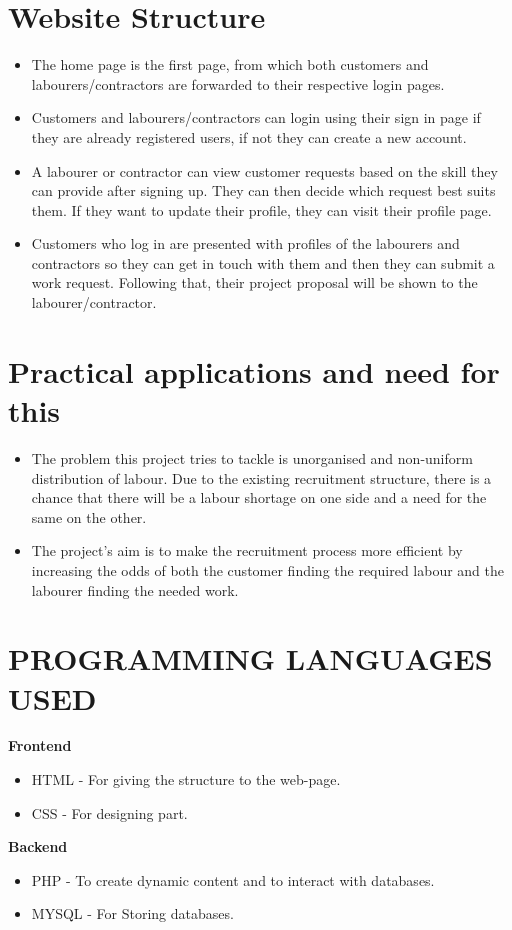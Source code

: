 \documentclass[12pt]{article}
\begin{document}
\section*{Website Structure}
\begin{itemize}
\item The home page is the first page, from which both customers and labourers/contractors are forwarded to their respective login pages.
\item Customers and labourers/contractors can login using their sign in page if they are already registered users, if not they can create a new account.
\item A labourer or contractor can view customer requests based on the skill they can provide after signing up. They can then decide which request best suits them. If they want to update their profile, they can visit their profile page.
\item Customers who log in are presented with profiles of the labourers and contractors so they can get in touch with them and then they can submit a work request. Following that, their project proposal will be shown to the labourer/contractor.
\end{itemize}


\section*{Practical applications and need for this}
\begin{itemize}
\item The problem this project tries to tackle is unorganised and non-uniform distribution of labour. Due to the existing recruitment structure, there is a chance that there will be a labour shortage on one side and a need for the same on the other.
\item The project's aim is to make the recruitment process more efficient by increasing the odds of both the customer finding the required labour and the labourer finding the needed work.
\end{itemize}

\section*{PROGRAMMING LANGUAGES USED}
\textbf{Frontend}
\begin{itemize}
    \item HTML - For giving the structure to the web-page.
    \item CSS - For designing part.
\end{itemize}
\textbf{Backend}
\begin{itemize}
    \item PHP - To create dynamic content and to interact with databases.
    \item MYSQL - For Storing databases.
\end{itemize}
\end{document}
